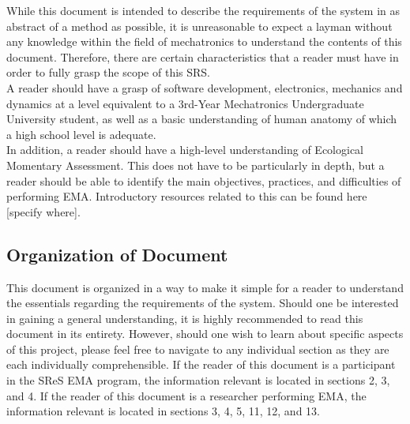 \documentclass[12pt]{article}
\begin{document}
While this document is intended to describe the requirements of the system in as abstract of a method as possible, it is unreasonable to expect a layman without any knowledge within the field of mechatronics to understand the contents of this document. Therefore, there are certain characteristics that a reader must have in order to fully grasp the scope of this SRS. \\

A reader should have a grasp of software development, electronics, mechanics and dynamics at a level equivalent to a 3rd-Year Mechatronics Undergraduate University student, as well as a basic understanding of human anatomy of which a high school level is adequate. \\

In addition, a reader should have a high-level understanding of Ecological Momentary Assessment. This does not have to be particularly in depth, but a reader should be able to identify the main objectives, practices, and difficulties of performing EMA. Introductory resources related to this can be found here [specify where]. \\

\subsection{Organization of Document}
This document is organized in a way to make it simple for a reader to understand the essentials regarding the requirements of the system. Should one be interested in gaining a general understanding, it is highly recommended to read this document in its entirety. However, should one wish to learn about specific aspects of this project, please feel free to navigate to any individual section as they are each individually comprehensible. If the reader of this document is a participant in the SReS EMA program, the information relevant is located in sections 2, 3, and 4. If the reader of this document is a researcher performing EMA, the information relevant is located in sections 3, 4, 5, 11, 12, and 13.\\ 



\end{document}

